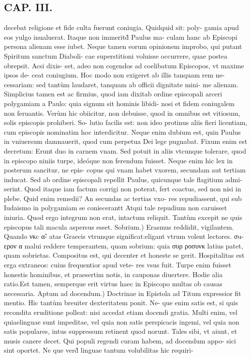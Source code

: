 \documentclass{article}
\begin{document}
\begin{pages}
\section*{CAP. III. }
\marginpar{[ p.32 ]}\pstart decebat religione et fide culta fuerunt coniugia. Quidquid sit: poly- gamia apud eos yulgo inualuerat. Itaque non immeritd̀ Paulus ma- culam hanc ab Episcopi persona alienam esse iubet. Neque tamen eorum opinionem improbo, qui putant Spiritum sanctum Diaboli- cae superstitioni voluisse occurrere, quae postea obrepsit. Acsi dixis- set, adeo non cogendos ad coelibatum Episcopos, vt maxime ipsos de- ceat coniugium. Hoc modo non exigeret ab illis tanquam rem ne- cessariam: sed tantùm laudaret, tanquam ab officii dignitate mini- me alienam. Simplicius tamen est ac firmius, quod iam dixitab ordine episcopali arceri polygamiam a Paulo: quia signum sit hominis libidi- nosi et fidem coniugalem non feruantis. Verùm hic obiicitur, non debuisse, quod in omnibus est vitiosum, solis episcopis prohiberi. So- lutio facilis est: non ideo protinus aliis fieri licentiam, cum episcopis nominatim hoc interdicitur. Neque enim dubium est, quin Paulus in vniuersum damnauerit, quod cum perpetua Dei lege pugnabat. Fixum enim est decretum: Erunt duo in carnem vnam. Sed potuit in aliis vtcunque tolerare, quod in episcopo niniis turpe, ideóque non ferendum fuisset. Neque enim hic lex in posterum sancitur, ne epis- copus qui vnam habet vxorem, secundam aut tertiam inducat. Sed ab ordine episcopali repellit Paulus, quicunque tale flagitium admi- serint. Quod itaque iam factum corrigi non poterat, fert coactus, sed non nisi in plebe. Quid enim remedii? An secundas ac tertias vxo- res repudiassent, qui sub Iudaismo in polygamiam se coniecerantt Atqui tale repudium non caruisset iniuria. Quod ergo integrum non erat, intactum reliquit. Tantùm excepit ne quis episcopus tali macula aspersus esset.  \pend\pstart Sobrium.) Erasmus reddidit, vigilantem. Quando νκc α̃- atas Graecis vtrunque significat:eligant vtrum volent lectores. σu- ερον α malui reddere temperantem, quam sobrium: quia συρ ροσυνκ latius patet, quam sobrietas. Compositus est, qui decenter et honeste se gerit. Hospitalitas est erga extraneos: cuius frequentior apud vete- res vsus fuit. Turpe enim fuisset honestis hominibus, et praesertim notis, in cauponas diuertere. Hodie alia ratio.Est tamen, semperque erit virtus haec in Episcopo multas ob causas necessaria.  \pend\pstart Aptum ad docendum.) Doctrinae in Epistola ad Titum expressior fit mentio. Hic tantùm breuiter dexteritatem ponit. Ne- que enim satis est, si quis recondita eruditione polleat: nisi accedat etiam docendi gratia. Multi enim, vel quiaelinguae sunt impeditae, vel quia non satis perspicacis ingemi, vel quia non satis populares, intus suppressum retinent quod norunt. Tales sibi, vt aiunt, et musis canere decet. Qui populi regendi curam habem, ad docendum appo- sici sint oportet. Ne que verd̀ linguae tantum volubilitas hic requiri-  \pend

\end{pages}
\end{document}
